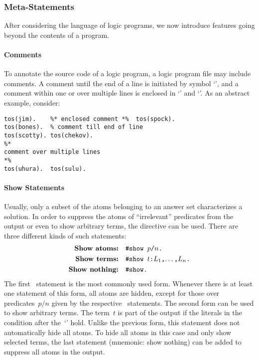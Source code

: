 \subsubsection{Meta-Statements}\label{subsec:gringo:meta}

After considering the language of logic programs,
we now introduce features going beyond the contents of a program.

\paragraph{Comments}
To annotate the source code of a logic program,
a logic program file may include comments.
A comment until the end of a line is initiated by symbol `\code{\%}',
and a comment within one or over multiple lines is enclosed
in `\code{\%*}' and `\code{*\%}'.
As an abstract example, consider:
%
\begin{lstlisting}[numbers=none,escapechar=@]
tos(jim).    %* enclosed comment *%  tos(spock).
tos(bones).  % comment till end of line
tos(scotty). tos(chekov).
%*
comment over multiple lines
*%
tos(uhura).  tos(sulu).
\end{lstlisting}

\paragraph{Show Statements}
%
Usually, only a subset of the atoms belonging
to an answer set characterizes a solution.
In order to suppress the atoms of ``irrelevant'' predicates from the output
or even to show arbitrary terms,
the  directive can be used.
There are three different kinds of such statements:
%
\begin{align*}
   \textbf{Show atoms:}   & \quad \texttt{\#show~$p$/$n$.} \\
   \textbf{Show terms:}   & \quad \texttt{\#show~$t$:$L_1$,$\dots$,$L_n$.} \\
   \textbf{Show nothing:} & \quad \texttt{\#show.}
\end{align*}
%
The first~ statement is the most commonly used form.
Whenever there is at least one statement of this form, all atoms are hidden,
except for those over predicates~$p/n$ given by the respective~ statements.
The second form can be used to show arbitrary terms.
The term~$t$ is part of the output if the literals in the condition after the~`\code{:}' hold.
Unlike the previous form,
this statement does not automatically hide all atoms.
To hide all atoms in this case and only show selected terms,
the last statement (mnemonic: show nothing) can be added to suppress all atoms in the output.

